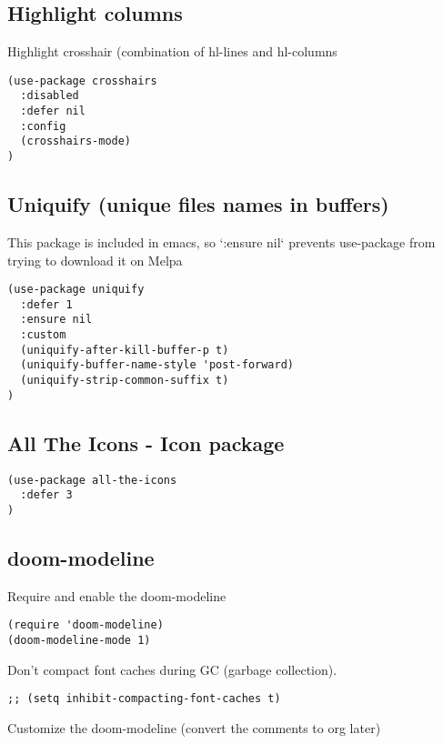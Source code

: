 \documentclass[11pt]{article}
\begin{document}
\subsection*{Highlight columns}
\label{sec:org7d91b35}

Highlight crosshair (combination of hl-lines and hl-columns

\begin{verbatim}
(use-package crosshairs
  :disabled
  :defer nil
  :config
  (crosshairs-mode)
)
\end{verbatim}

\subsection*{Uniquify (unique files names in buffers)}
\label{sec:orgcf8c84e}

This package is included in emacs, so `:ensure nil` prevents use-package from trying to download it on Melpa

\begin{verbatim}
(use-package uniquify
  :defer 1
  :ensure nil
  :custom
  (uniquify-after-kill-buffer-p t)
  (uniquify-buffer-name-style 'post-forward)
  (uniquify-strip-common-suffix t)
)
\end{verbatim}

\subsection*{All The Icons - Icon package}
\label{sec:org7a0087f}

\begin{verbatim}
(use-package all-the-icons
  :defer 3
)
\end{verbatim}

\subsection*{doom-modeline}
\label{sec:org68ac74d}

Require and enable the doom-modeline
\begin{verbatim}
(require 'doom-modeline)
(doom-modeline-mode 1)
\end{verbatim}

Don’t compact font caches during GC (garbage collection).
\begin{verbatim}
;; (setq inhibit-compacting-font-caches t)
\end{verbatim}

Customize the doom-modeline (convert the comments to org later)
\end{document}
